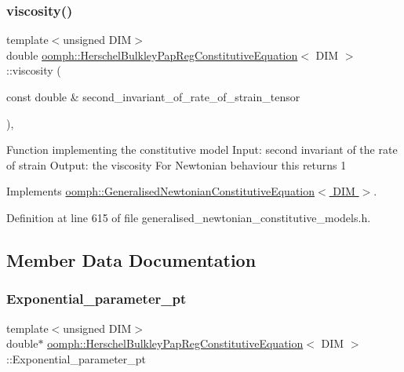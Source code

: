 \subsubsection{\texorpdfstring{viscosity()}{viscosity()}}
{\footnotesize\ttfamily template$<$unsigned D\+IM$>$ \\
double \hyperlink{classoomph_1_1HerschelBulkleyPapRegConstitutiveEquation}{oomph\+::\+Herschel\+Bulkley\+Pap\+Reg\+Constitutive\+Equation}$<$ D\+IM $>$\+::viscosity (\begin{DoxyParamCaption}\item[{const double \&}]{second\+\_\+invariant\+\_\+of\+\_\+rate\+\_\+of\+\_\+strain\+\_\+tensor }\end{DoxyParamCaption})\hspace{0.3cm}{\ttfamily [inline]}, {\ttfamily [virtual]}}

Function implementing the constitutive model Input\+: second invariant of the rate of strain Output\+: the viscosity For Newtonian behaviour this returns 1 

Implements \hyperlink{classoomph_1_1GeneralisedNewtonianConstitutiveEquation_a3e6d811786e39ca3c3a9b1c46249442f}{oomph\+::\+Generalised\+Newtonian\+Constitutive\+Equation$<$ D\+I\+M $>$}.



Definition at line 615 of file generalised\+\_\+newtonian\+\_\+constitutive\+\_\+models.\+h.



\subsection{Member Data Documentation}
\mbox{\label{classoomph_1_1HerschelBulkleyPapRegConstitutiveEquation_ad21182de6f65351e6dcac6e288ecc51d}} 
\subsubsection{\texorpdfstring{Exponential\+\_\+parameter\+\_\+pt}{Exponential\_parameter\_pt}}
{\footnotesize\ttfamily template$<$unsigned D\+IM$>$ \\
double$\ast$ \hyperlink{classoomph_1_1HerschelBulkleyPapRegConstitutiveEquation}{oomph\+::\+Herschel\+Bulkley\+Pap\+Reg\+Constitutive\+Equation}$<$ D\+IM $>$\+::Exponential\+\_\+parameter\+\_\+pt\hspace{0.3cm}{\ttfamily [private]}}



